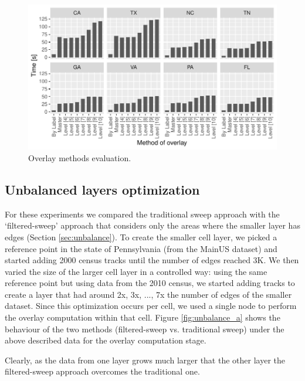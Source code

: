 \begin{figure}
    \centering
    \includegraphics[width=0.8\linewidth]{figures/experiments/Overlay_Tester}
    \caption{Overlay methods evaluation.}\label{fig:overlay_tester}
\end{figure}

\subsection{Unbalanced layers optimization}

For these experiments we compared the traditional sweep approach with the `filtered-sweep' approach that considers only the areas where the smaller layer has edges (Section \ref{sec:unbalance}). 
To create the smaller cell layer, we picked a reference point in the state of Pennsylvania (from the MainUS dataset) and started adding 2000 census tracks until the number of edges reached 3K. We then varied the size of the larger cell layer in a controlled way: using the same reference point but using data from the 2010 census, we started adding tracks to create a layer that had around 2x, 3x, ..., 7x the number of edges of the smaller dataset. Since this optimization occurs per cell, we used a single node to perform the overlay computation within that cell.
Figure \ref{fig:unbalance_a} shows the behaviour of the two methods (filtered-sweep vs. traditional sweep) under the above described data for the overlay computation stage.  

Clearly, as the data from one layer grows much larger that the other layer the filtered-sweep approach overcomes the traditional one.

